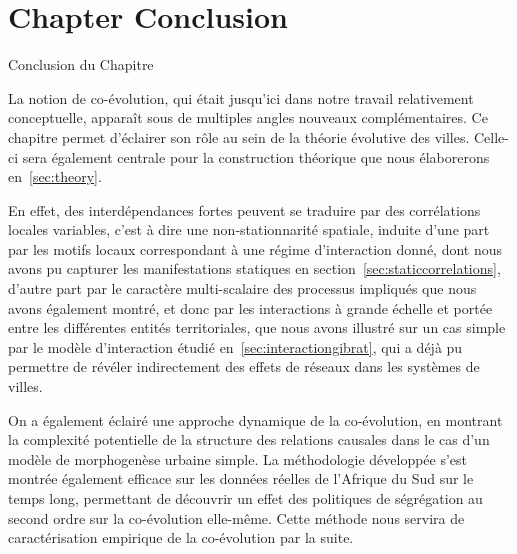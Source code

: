 




\newpage


\section*{Chapter Conclusion}{Conclusion du Chapitre}


La notion de co-évolution, qui était jusqu'ici dans notre travail  relativement conceptuelle, apparaît sous de multiples angles nouveaux complémentaires. Ce chapitre permet d'éclairer son rôle au sein de la théorie évolutive des villes. Celle-ci sera également centrale pour la construction théorique que nous élaborerons en~\ref{sec:theory}.
 
En effet, des interdépendances fortes peuvent se traduire par des corrélations locales variables, c'est à dire une non-stationnarité spatiale, induite d'une part par les motifs locaux correspondant à une régime d'interaction donné, dont nous avons pu capturer les manifestations statiques en section~\ref{sec:staticcorrelations}, d'autre part par le caractère multi-scalaire des processus impliqués que nous avons également montré, et donc par les interactions à grande échelle et portée entre les différentes entités territoriales, que nous avons illustré sur un cas simple par le modèle d'interaction étudié en~\ref{sec:interactiongibrat}, qui a déjà pu permettre de révéler indirectement des effets de réseaux dans les systèmes de villes. 

On a également éclairé une approche dynamique de la co-évolution, en montrant la complexité potentielle de la structure des relations causales dans le cas d'un modèle de morphogenèse urbaine simple. La méthodologie développée s'est montrée également efficace sur les données réelles de l'Afrique du Sud sur le temps long, permettant de découvrir un effet des politiques de ségrégation au second ordre sur la co-évolution elle-même. Cette méthode nous servira de caractérisation empirique de la co-évolution par la suite.





\stars


